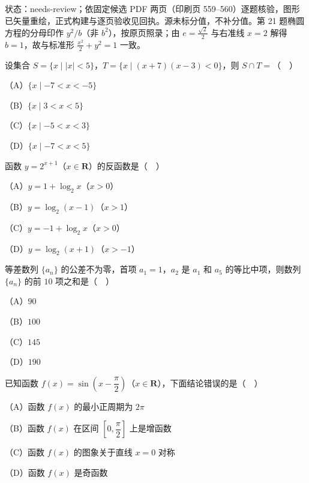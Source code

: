 

状态：needs-review；依固定候选 PDF 两页（印刷页 559–560）逐题核验，图形已矢量重绘，正式构建与逐页验收见回执。源未标分值，不补分值。第 21 题椭圆方程的分母印作 $y^2/b$（非 $b^2$），按原页照录；由 $e=\frac{\sqrt2}{2}$ 与右准线 $x=2$ 解得 $b=1$，故与标准形 $\frac{x^2}{2}+y^2=1$ 一致。


\begin{question}
设集合 $S=\{x\mid |x|<5\}$，$T=\{x\mid (x+7)(x-3)<0\}$，则 $S\cap T=$（　）

（A）$\{x\mid -7<x<-5\}$

（B）$\{x\mid 3<x<5\}$

（C）$\{x\mid -5<x<3\}$

（D）$\{x\mid -7<x<5\}$

\end{question}
\begin{question}
函数 $y=2^{x+1}$（$x\in\mathbf R$）的反函数是（　）

（A）$y=1+\log_2x$（$x>0$）

（B）$y=\log_2(x-1)$（$x>1$）

（C）$y=-1+\log_2x$（$x>0$）

（D）$y=\log_2(x+1)$（$x>-1$）

\end{question}
\begin{question}
等差数列 $\{a_n\}$ 的公差不为零，首项 $a_1=1$，$a_2$ 是 $a_1$ 和 $a_5$ 的等比中项，则数列 $\{a_n\}$ 的前 $10$ 项之和是（　）

（A）$90$

（B）$100$

（C）$145$

（D）$190$

\end{question}
\begin{question}
已知函数 $f(x)=\sin\left(x-\dfrac{\pi}{2}\right)$（$x\in\mathbf R$），下面结论错误的是（　）

（A）函数 $f(x)$ 的最小正周期为 $2\pi$

（B）函数 $f(x)$ 在区间 $\left[0,\dfrac{\pi}{2}\right]$ 上是增函数

（C）函数 $f(x)$ 的图象关于直线 $x=0$ 对称

（D）函数 $f(x)$ 是奇函数

\end{question}
